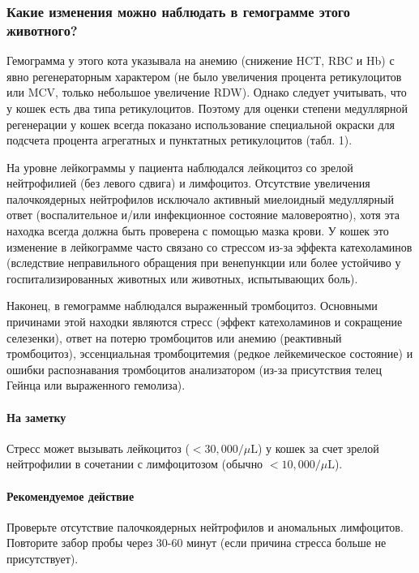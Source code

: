 \documentclass[a4paper,12pt]{book}
\begin{document}
\subsubsection*{Какие изменения можно наблюдать в гемограмме этого животного?}
Гемограмма у этого кота указывала на анемию (снижение HCT, RBC и Hb) с явно регенераторным характером (не было увеличения процента ретикулоцитов или MCV, только небольшое увеличение RDW). Однако следует учитывать, что у кошек есть два типа ретикулоцитов. Поэтому для оценки степени медуллярной регенерации у кошек всегда показано использование специальной окраски для подсчета процента агрегатных и пунктатных ретикулоцитов (табл. 1).

На уровне лейкограммы у пациента наблюдался лейкоцитоз со зрелой нейтрофилией (без левого сдвига) и лимфоцитоз. Отсутствие увеличения палочкоядерных нейтрофилов исключало активный миелоидный медуллярный ответ (воспалительное и/или инфекционное состояние маловероятно), хотя эта находка всегда должна быть проверена с помощью мазка крови. У кошек это изменение в лейкограмме часто связано со стрессом из-за эффекта катехоламинов (вследствие неправильного обращения при венепункции или более устойчиво у госпитализированных животных или животных, испытывающих боль).

Наконец, в гемограмме наблюдался выраженный тромбоцитоз. Основными причинами этой находки являются стресс (эффект катехоламинов и сокращение селезенки), ответ на потерю тромбоцитов или анемию (реактивный тромбоцитоз), эссенциальная тромбоцитемия (редкое лейкемическое состояние) и ошибки распознавания тромбоцитов анализатором (из-за присутствия телец Гейнца или выраженного гемолиза).

\paragraph{На заметку}
Стресс может вызывать лейкоцитоз ($< 30,000 / \mu\mathrm{L}$) у кошек за счет зрелой нейтрофилии в сочетании с лимфоцитозом (обычно $< 10,000 / \mu\mathrm{L}$).

\paragraph{Рекомендуемое действие}
Проверьте отсутствие палочкоядерных нейтрофилов и аномальных лимфоцитов. Повторите забор пробы через 30-60 минут (если причина стресса больше не присутствует).
\end{document}
